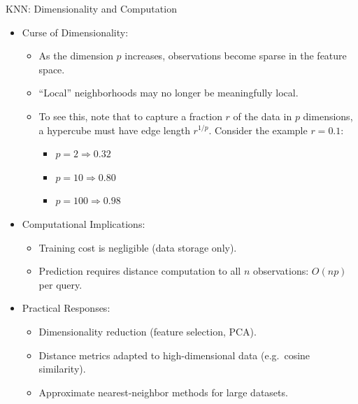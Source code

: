 \documentclass[aspectratio=169]{beamer}
\newcommand{\1}{\mathbf{1}}
\begin{document}
\begin{frame}{KNN: Dimensionality and Computation}
    \small
    \begin{itemize}
        \item Curse of Dimensionality:
        \begin{itemize}
            \item As the dimension $p$ increases, observations become sparse in the feature space.
            \item ``Local'' neighborhoods may no longer be meaningfully local.
            \item To see this, note that to capture a fraction $r$ of the data in $p$ dimensions, a hypercube must have edge length $r^{1/p}$. Consider the example $r=0.1$:
            \begin{itemize}
                \item $p=2 \Rightarrow 0.32$
                \item $p=10 \Rightarrow 0.80$
                \item $p=100 \Rightarrow 0.98$
            \end{itemize}
        \end{itemize}
        
        \vspace{0.3em}
        \item Computational Implications:
        \begin{itemize}
            \item Training cost is negligible (data storage only).
            \item Prediction requires distance computation to all $n$ observations:
            $O(np)$ per query.
        \end{itemize}
    
        \item Practical Responses:
        \begin{itemize}
            \item Dimensionality reduction (feature selection, PCA).
            \item Distance metrics adapted to high-dimensional data (e.g.\ cosine similarity).
            \item Approximate nearest-neighbor methods for large datasets.
        \end{itemize}
    \end{itemize}
\end{frame}
\end{document}
